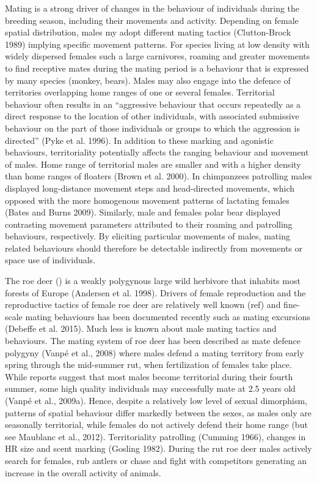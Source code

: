 \documentclass[a4paper,11pt]{article}
\newcommand{\species}[1]{(\xmakefirstuc{\emph{#1}})}
\begin{document}
Mating is a strong driver of changes in the behaviour of individuals
during the breeding season, including their movements and
activity. Depending on female spatial distribution, males my adopt
different mating tactics (Clutton-Brock 1989) implying specific
movement patterns. For species living at low density with widely
dispersed females such a large carnivores, roaming and greater
movements to find receptive mates during the mating period is a
behaviour that is expressed by many species (monkey, bears). Males may
also engage into the defence of territories overlapping home ranges of
one or several females. Territorial behaviour often results in an
“aggressive behaviour that occurs repeatedly as a direct response to
the location of other individuals, with associated submissive
behaviour on the part of those individuals or groups to which the
aggression is directed” (Pyke et al. 1996). In addition to these
marking and agonistic behaviours, territoriality potentially affects
the ranging behaviour and movement of males. Home range of territorial
males are smaller and with a higher density than home ranges of
floaters (Brown et al. 2000). In chimpanzees patrolling males
displayed long-distance movement steps and head-directed movements,
which opposed with the more homogenous movement patterns of lactating
females (Bates and Burns 2009). Similarly, male and females polar bear
displayed contrasting movement parameters attributed to their roaming
and patrolling behaviours, respectively. By eliciting particular
movements of males, mating related behaviours should therefore be
detectable indirectly from movements or space use of individuals.

The roe deer \species{Capreolus capreolus} is a weakly polygynous large
wild herbivore that inhabits most forests of Europe (Andersen et
al. 1998). Drivers of female reproduction and the reproductive tactics
of female roe deer are relatively well known (ref) and fine-scale
mating behaviours has been documented recently such as mating
excursions (Debeffe et al. 2015). Much less is known about male mating
tactics and behaviours. The mating system of roe deer has been
described as mate defence polygyny (Vanpé et al., 2008) where males
defend a mating territory from early spring through the mid-summer
rut, when fertilization of females take place. While reports suggest
that most males become territorial during their fourth summer, some
high quality individuals may successfully mate at 2.5 years old (Vanpé
et al., 2009a). Hence, despite a relatively low level of sexual
dimorphism, patterns of spatial behaviour differ markedly between the
sexes, as males only are seasonally territorial, while females do not
actively defend their home range (but see Maublanc et al.,
2012). Territoriality patrolling (Cumming 1966), changes in HR size
and scent marking (Gosling 1982). During the rut roe deer males
actively search for females, rub antlers or chase and fight with
competitors generating an increase in the overall activity of animals.
\end{document}
